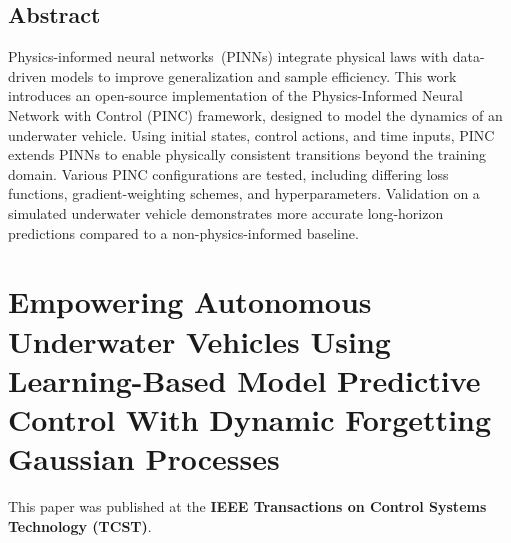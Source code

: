 \documentclass[
10pt, %
b5paper, %
twoside, %
openright  %
]{book}  %
\begin{document}
\section{Abstract}
Physics-informed neural networks~(PINNs) integrate physical laws with data-driven models to improve generalization and sample efficiency. This work introduces an open-source implementation of the Physics-Informed Neural Network with Control (PINC) framework, designed to model the dynamics of an underwater vehicle. Using initial states, control actions, and time inputs, PINC extends PINNs to enable physically consistent transitions beyond the training domain. Various PINC configurations are tested, including differing loss functions, gradient-weighting schemes, and hyperparameters. Validation on a simulated underwater vehicle demonstrates more accurate long-horizon predictions compared to a non-physics-informed baseline. 
\newpage





\chapter{Empowering Autonomous Underwater Vehicles Using Learning-Based Model Predictive Control With Dynamic Forgetting Gaussian Processes}
\vspace{1cm}
This paper was published at the \textbf{IEEE Transactions on Control Systems Technology (TCST)}.
\end{document}
